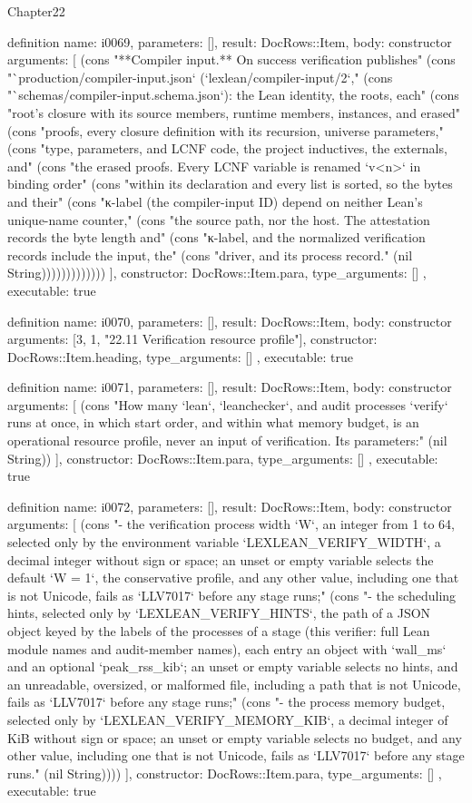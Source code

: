 \begin{lexlean}{Chapter22}
\begin{semanticmodule}
definition{
  name: i0069,
  parameters: [],
  result: DocRows::Item,
  body: constructor{
    arguments: [
      (cons "**Compiler input.** On success verification publishes" (cons "`production/compiler-input.json` (`lexlean/compiler-input/2`," (cons "`schemas/compiler-input.schema.json`): the Lean identity, the roots, each" (cons "root's closure with its source members, runtime members, instances, and erased" (cons "proofs, every closure definition with its recursion, universe parameters," (cons "type, parameters, and LCNF code, the project inductives, the externals, and" (cons "the erased proofs. Every LCNF variable is renamed `v<n>` in binding order" (cons "within its declaration and every list is sorted, so the bytes and their" (cons "κ-label (the compiler-input ID) depend on neither Lean's unique-name counter," (cons "the source path, nor the host. The attestation records the byte length and" (cons "κ-label, and the normalized verification records include the input, the" (cons "driver, and its process record." (nil String)))))))))))))
    ],
    constructor: DocRows::Item.para,
    type_arguments: []
  },
  executable: true
}

definition{
  name: i0070,
  parameters: [],
  result: DocRows::Item,
  body: constructor{
    arguments: [3, 1, "22.11 Verification resource profile"],
    constructor: DocRows::Item.heading,
    type_arguments: []
  },
  executable: true
}

definition{
  name: i0071,
  parameters: [],
  result: DocRows::Item,
  body: constructor{
    arguments: [
      (cons "How many `lean`, `leanchecker`, and audit processes `verify` runs at once, in which start order, and within what memory budget, is an operational resource profile, never an input of verification. Its parameters:" (nil String))
    ],
    constructor: DocRows::Item.para,
    type_arguments: []
  },
  executable: true
}

definition{
  name: i0072,
  parameters: [],
  result: DocRows::Item,
  body: constructor{
    arguments: [
      (cons "- the verification process width `W`, an integer from 1 to 64, selected only by the environment variable `LEXLEAN_VERIFY_WIDTH`, a decimal integer without sign or space; an unset or empty variable selects the default `W = 1`, the conservative profile, and any other value, including one that is not Unicode, fails as `LLV7017` before any stage runs;" (cons "- the scheduling hints, selected only by `LEXLEAN_VERIFY_HINTS`, the path of a JSON object keyed by the labels of the processes of a stage (this verifier: full Lean module names and audit-member names), each entry an object with `wall_ms` and an optional `peak_rss_kib`; an unset or empty variable selects no hints, and an unreadable, oversized, or malformed file, including a path that is not Unicode, fails as `LLV7017` before any stage runs;" (cons "- the process memory budget, selected only by `LEXLEAN_VERIFY_MEMORY_KIB`, a decimal integer of KiB without sign or space; an unset or empty variable selects no budget, and any other value, including one that is not Unicode, fails as `LLV7017` before any stage runs." (nil String))))
    ],
    constructor: DocRows::Item.para,
    type_arguments: []
  },
  executable: true
}


\end{semanticmodule}
\end{lexlean}
